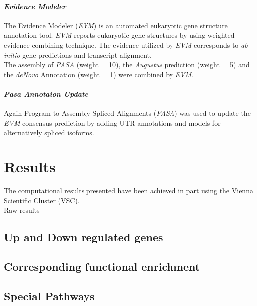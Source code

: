 \documentclass[12pt, a4paper]{report}
\begin{document}
\subsubsection{\textit{Evidence Modeler}}
The Evidence Modeler (\textit{EVM}) is an automated eukaryotic gene structure annotation tool. \textit{EVM} reports eukaryotic gene structures by using weighted evidence combining technique. The evidence utilized by \textit{EVM} corresponds to \textit{ab initio} gene predictions and transcript alignment. \cite{Haas2008} \\
The assembly of \textit{PASA} (weight = 10), the \textit{Augustus} prediction (weight = 5) and the \textit{deNovo} Annotation (weight = 1) were combined by \textit{EVM}.

\subsubsection{\textit{Pasa Annotaion Update}}
Again Program to Assembly Spliced Alignments (\textit{PASA}) was used to update the \textit{EVM} consensus prediction by adding UTR annotations and models for alternatively spliced isoforms.


\newpage
\setcounter{chapter}{3}\setcounter{section}{0}
\chapter*{Results}
The computational results presented have been achieved in part using the Vienna Scientific Cluster (VSC). \\
Raw results 


\section{Up and Down regulated genes}

\section{Corresponding functional enrichment}

\section{Special Pathways}




\newpage
\setcounter{chapter}{4}\setcounter{section}{0}
\end{document}
